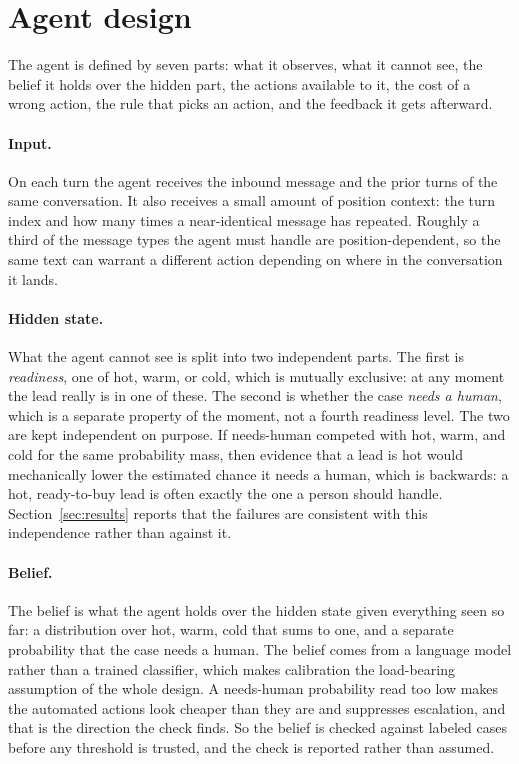 \documentclass{article}
\begin{document}
\section{Agent design}
\label{sec:design}

The agent is defined by seven parts: what it observes, what it cannot see, the
belief it holds over the hidden part, the actions available to it, the cost of a
wrong action, the rule that picks an action, and the feedback it gets afterward.

\paragraph{Input.} On each turn the agent receives the inbound message and the
prior turns of the same conversation. It also receives a small amount of
position context: the turn index and how many times a near-identical message has
repeated. Roughly a third of the message types the agent must handle are
position-dependent, so the same text can warrant a different action depending on
where in the conversation it lands.

\paragraph{Hidden state.} What the agent cannot see is split into two independent
parts. The first is \emph{readiness}, one of hot, warm, or cold, which is
mutually exclusive: at any moment the lead really is in one of these. The second
is whether the case \emph{needs a human}, which is a separate property of the
moment, not a fourth readiness level. The two are kept independent on purpose. If
needs-human competed with hot, warm, and cold for the same probability mass, then
evidence that a lead is hot would mechanically lower the estimated chance it needs
a human, which is backwards: a hot, ready-to-buy lead is often exactly the one a
person should handle. Section~\ref{sec:results} reports that the failures are
consistent with this independence rather than against it.

\paragraph{Belief.} The belief is what the agent holds over the hidden state
given everything seen so far: a distribution over hot, warm, cold that sums to
one, and a separate probability that the case needs a human. The belief comes
from a language model rather than a trained classifier, which makes calibration
the load-bearing assumption of the whole design. A needs-human probability read
too low makes the automated actions look cheaper than they are and suppresses
escalation, and that is the direction the check finds. So the belief is checked
against labeled cases before any threshold is trusted, and the check is reported
rather than assumed.
\end{document}
